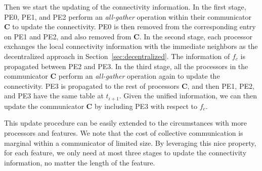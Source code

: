 Then we start the updating of the connectivity information. In the first stage, PE0, PE1, and PE2 perform an \emph{all-gather} operation within their communicator $\textbf{C}$ to update the connectivity. PE0 is then removed from the corresponding entry on PE1 and PE2, and also removed from $\textbf{C}$. In the second stage, each processor exchanges the local connectivity information with the immediate neighbors as the decentralized approach in Section~\ref{sec:decentralized}. The information of $f_c$ is propagated between PE2 and PE3. In the third stage, all the processors in the communicator $\textbf{C}$ perform an \emph{all-gather} operation again to update the connectivity. PE3 is propagated to the rest of processors $\textbf{C}$, and then PE1, PE2, and PE3 have the same table at $t_{i+1}$. Given the unified information, we can then update the communicator $\textbf{C}$ by including PE3 with respect to $f_c$. 

This update procedure can be easily extended to the circumstances with more processors and features. We note that the cost of collective communication is marginal within a communicator of limited size. By leveraging this nice property, for each feature, we only need at most three stages to update the connectivity information, no matter the length of the feature.  



